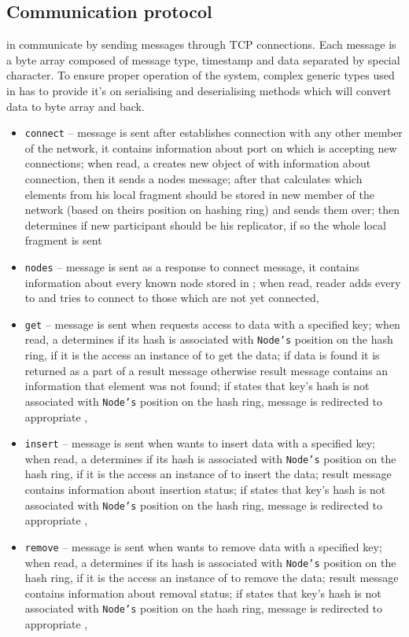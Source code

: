     \subsection{Communication protocol}
        \Nodes in \DHTS communicate by sending messages through TCP connections. 
        Each message is a byte array composed of message type, timestamp and data separated by special character. 
        To ensure proper operation of the system, complex generic types used in \PHT has to provide it's on serialising and deserialising methods which will convert data to byte array and back.
        \begin{itemize}
            \item \texttt{connect} -- message is sent after \Node establishes connection with any other member of the network, it contains information about port on which \Node is accepting new connections; when read, a \Node creates new object of \KnownNode with information about connection, then it sends a nodes message; after that \Node calculates which elements from his local \PHT fragment should be stored in new member of the network (based on theirs position on hashing ring) and sends them over; then \Node determines if new participant should be his replicator, if so the whole local \PHT fragment is sent
            \item \texttt{nodes} -- message is sent as a response to connect message, it contains information about every known node stored in \NodesMap; when read, reader adds every \Node to \NodesMap and tries to connect to those which are not yet connected,
            \item \texttt{get} -- message is sent when \Node requests access to data with a specified key; when read, a \Node determines if its hash is associated with \texttt{Node's} position on the hash ring, if it is the \Node access an instance of \PHT to get the data; if data is found it is returned as a part of a result message otherwise result message contains an information that element was not found; if \Node states that key's hash is not associated with \texttt{Node's} position on the hash ring, message is redirected to appropriate \Node,
            \item \texttt{insert} -- message is sent when \Node wants to insert data with a specified key; when read, a \Node determines if its hash is associated with \texttt{Node's} position on the hash ring, if it is the \Node access an instance of \PHT to insert the data; result message contains information about insertion status; if \Node states that key's hash is not associated with \texttt{Node's} position on the hash ring, message is redirected to appropriate \Node,
            \item \texttt{remove} -- message is sent when \Node wants to remove data with a specified key; when read, a \Node determines if its hash is associated with \texttt{Node's} position on the hash ring, if it is the \Node access an instance of \PHT to remove the data; result message contains information about removal status; if \Node states that key's hash is not associated with \texttt{Node's} position on the hash ring, message is redirected to appropriate \Node,
        \end{itemize}
        

